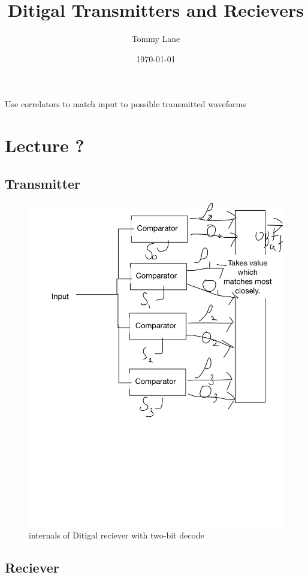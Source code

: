 \documentclass[11pt]{article}
\author{Tommy Lane}
\date{\today}
\title{Ditigal Transmitters and Recievers}
\begin{document}
\maketitle
\tableofcontents

Use correlators to match input to possible transmitted waveforms
\section{Lecture ?}
\label{sec-1}
\subsection{Transmitter}
\label{sec-1-1}
\begin{figure}[htb]
\centering
\includegraphics[width=.9\linewidth]{./img/Digital_reciever.png}
\caption{internals of Ditigal reciever with two-bit decode}
\end{figure}

\subsection{Reciever}
\label{sec-1-2}
\end{document}
